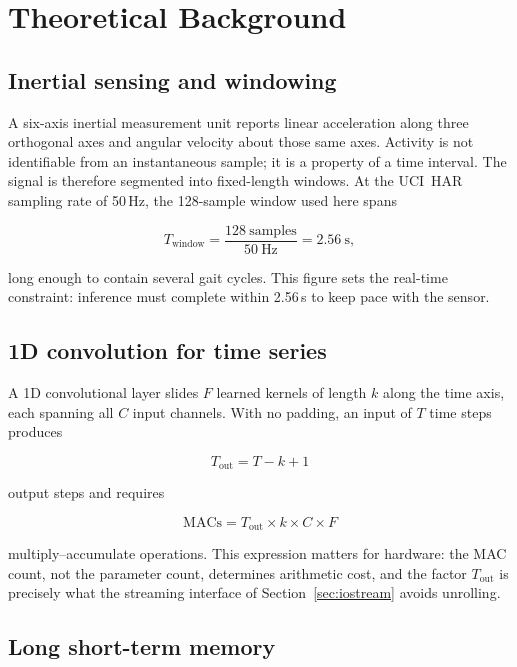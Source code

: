\documentclass[11pt,a4paper]{article}
\begin{document}
\section{Theoretical Background}

\subsection{Inertial sensing and windowing}

A six-axis inertial measurement unit reports linear acceleration along three
orthogonal axes and angular velocity about those same axes. Activity is not
identifiable from an instantaneous sample; it is a property of a time interval.
The signal is therefore segmented into fixed-length windows. At the UCI~HAR
sampling rate of 50\,Hz, the 128-sample window used here spans

\begin{equation}
T_{\text{window}} = \frac{128\ \text{samples}}{50\ \text{Hz}} = 2.56\ \text{s},
\end{equation}

long enough to contain several gait cycles. This figure sets the real-time
constraint: inference must complete within 2.56\,s to keep pace with the sensor.

\subsection{1D convolution for time series}

A 1D convolutional layer slides $F$ learned kernels of length $k$ along the time
axis, each spanning all $C$ input channels. With no padding, an input of $T$
time steps produces

\begin{equation}
T_{\text{out}} = T - k + 1
\end{equation}

output steps and requires

\begin{equation}
\text{MACs} = T_{\text{out}} \times k \times C \times F
\end{equation}

multiply--accumulate operations. This expression matters for hardware: the MAC
count, not the parameter count, determines arithmetic cost, and the factor
$T_{\text{out}}$ is precisely what the streaming interface of
Section~\ref{sec:iostream} avoids unrolling.

\subsection{Long short-term memory}
\end{document}
